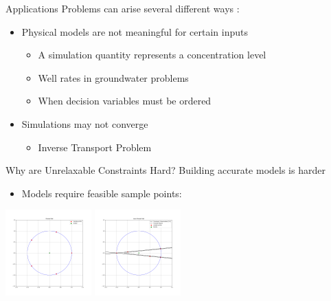 \documentclass{beamer}
\begin{document}
\begin{frame}{Applications}
	Problems can arise several different ways \cite{digabel2015taxonomy}:
	\begin{itemize}
		\setlength\itemsep{1.5em}
		\item Physical models are not meaningful for certain inputs
		\begin{itemize}
			\item A simulation quantity represents a concentration level
			\item Well rates in groundwater problems
			\item When decision variables must be ordered
		\end{itemize}
		\item Simulations may not converge
		\begin{itemize}
			\item Inverse Transport Problem \cite{osti_1247138}
		\end{itemize}
	\end{itemize}
\end{frame}


\begin{frame}{Why are Unrelaxable Constraints Hard?}
	Building accurate models is harder
	\begin{itemize}
		\item Models require feasible sample points:
	\end{itemize}
	\begin{center}
		\includegraphics[width=125px]{images/poised.png}
		\includegraphics[width=125px]{images/not_poised.png}
	\end{center}
\end{frame}
\end{document}
